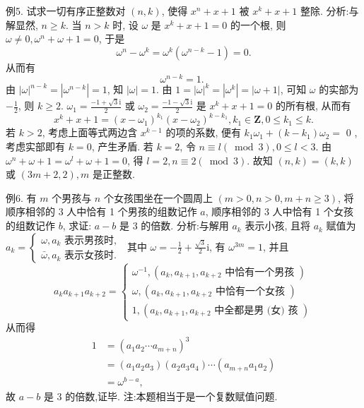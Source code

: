 例5. 试求一切有序正整数对 $(n, k)$, 使得 $x^n+x+1$ 被 $x^k+x+1$ 整除.
分析:与解显然, $n \geqslant k$.
当 $n>k$ 时, 设 $\omega$ 是 $x^k+x+1=0$ 的一个根, 则 $\omega \neq 0, \omega^n+\omega+1=0$, 于是
$$
\omega^n-\omega^k=\omega^k\left(\omega^{n-k}-1\right)=0 .
$$
从而有
$$
\omega^{n-k}=1 \text {. }
$$
由 $|\omega|^{n-k}=\left|\omega^{n-k}\right|=1$, 知 $|\omega|=1$.
由 $1=|\omega|^k=\left|\omega^k\right|=|\omega+1|$, 可知 $\omega$ 的实部为 $-\frac{1}{2}$, 则 $k \geqslant 2$.
$\omega_1=\frac{-1+\sqrt{3} \mathrm{i}}{2}$ 或 $\omega_2=\frac{-1-\sqrt{3} \mathrm{i}}{2}$ 是 $x^k+x+1=0$ 的所有根, 从而有
$$
x^k+x+1=\left(x-\omega_1\right)^{k_1}\left(x-\omega_2\right)^{k-k_1}, k_1 \in \mathbf{Z}, 0 \leqslant k_1 \leqslant k .
$$
若 $k>2$, 考虑上面等式两边含 $x^{k-1}$ 的项的系数, 便有 $k_1 \omega_1+\left(k-k_1\right) \omega_2=$ 0 ,考虑实部即有 $k=0$, 产生矛盾.
若 $k=2$, 令 $n \equiv l(\bmod 3), 0 \leqslant l<3$. 由 $\omega^n+\omega+1=\omega^l+\omega+1=0$, 得 $l=2, n \equiv 2(\bmod 3)$.
故知 $(n, k)=(k, k)$ 或 $(3 m+2,2), m$ 是正整数.



例6. 有 $m$ 个男孩与 $n$ 个女孩围坐在一个圆周上 $(m>0, n>0, m+ n \geqslant 3)$, 将顺序相邻的 3 人中恰有 1 个男孩的组数记作 $a$, 顺序相邻的 3 人中恰有 1 个女孩的组数记作 $b$, 求证: $a-b$ 是 3 的倍数.
分析:与解用 $a_k$ 表示小孩, 且将 $a_k$ 赋值为 $a_k=\left\{\begin{array}{l}\omega, a_k \text { 表示男孩时, } \\ \bar{\omega}, a_k \text { 表示女孩时.
}\end{array}\right.$
其中 $\omega=-\frac{1}{2}+\frac{\sqrt{3}}{2} \mathrm{i}$, 有 $\omega^{3 m}=1$, 并且
$$
a_k a_{k+1} a_{k+2}=\left\{\begin{array}{l}
\omega^{-1},\left(a_k, a_{k+1}, a_{k+2} \text { 中恰有一个男孩 }\right) \\
\omega,\left(a_k, a_{k+1}, a_{k+2} \text { 中恰有一个女孩 }\right) \\
1,\left(a_k, a_{k+1}, a_{k+2} \text { 中全都是男 (女) 孩 }\right)
\end{array}\right.
$$
从而得
$$
\begin{aligned}
1 & =\left(a_1 a_2 \cdots a_{m+n}\right)^3 \\
& =\left(a_1 a_2 a_3\right)\left(a_2 a_3 a_4\right) \cdots\left(a_{m+n} a_1 a_2\right) \\
& =\omega^{b-a},
\end{aligned}
$$
故 $a-b$ 是 3 的倍数,证毕.
注:本题相当于是一个复数赋值问题.



